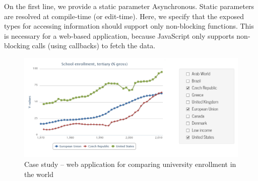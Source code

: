 \documentclass[submission,copyright,creativecommons]{eptcs}
\newcommand{\ident}[1]{\textnormal{\sffamily #1}}
\begin{document}
On the first line, we provide a static parameter \ident{Asynchronous}. Static parameters are
resolved at compile-time (or edit-time). Here, we specify that the exposed types for accessing
information should support only non-blocking functions. This is necessary for a web-based
application, because JavaScript only supports non-blocking calls (using callbacks) to fetch the data.


\begin{figure}[!t]
\hspace{3em} \includegraphics[width=35em]{worldbank.png}
\caption{Case study -- web application for comparing university enrollment in the world}
\label{fig:wb}
\end{figure}

\end{document}
